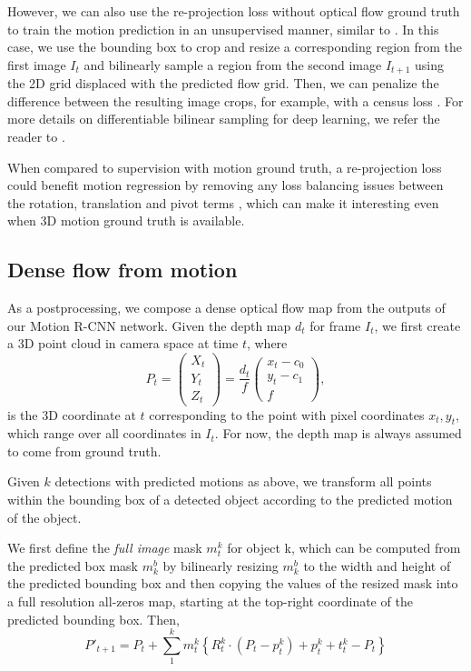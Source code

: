 However, we can also use the re-projection loss without optical flow ground truth
to train the motion prediction in an unsupervised manner, similar to \cite{SfmNet}.
In this case, we use the bounding box to crop and resize a corresponding region
from the first image $I_t$ and bilinearly sample a region from the second image $I_{t+1}$
using the 2D grid displaced with the predicted flow grid. Then, we can penalize the difference
between the resulting image crops, for example, with a census loss \cite{CensusTerm,UnFlow}.
For more details on differentiable bilinear sampling for deep learning, we refer the reader to
\cite{STN}.

When compared to supervision with motion ground truth, a re-projection
loss could benefit motion regression by removing any loss balancing issues between the
rotation, translation and pivot terms \cite{PoseNet2},
which can make it interesting even when 3D motion ground truth is available.


\subsection{Dense flow from motion}
\label{ssec:postprocessing}
As a postprocessing, we compose a dense optical flow map from the outputs of our Motion R-CNN network.
Given the depth map $d_t$ for frame $I_t$, we first create a 3D point cloud in camera space at time $t$,
where
\begin{equation}
P_t =
\begin{pmatrix}
X_t \\ Y_t \\ Z_t
\end{pmatrix}
=
\frac{d_t}{f}
\begin{pmatrix}
x_t - c_0 \\ y_t - c_1 \\ f
\end{pmatrix},
\end{equation}
is the 3D coordinate at $t$ corresponding to the point with pixel coordinates $x_t, y_t$,
which range over all coordinates in $I_t$.
For now, the depth map is always assumed to come from ground truth.

Given $k$ detections with predicted motions as above, we transform all points within the bounding
box of a detected object according to the predicted motion of the object.

We first define the \emph{full image} mask $m_t^k$ for object k,
which can be computed from the predicted box mask $m_k^b$ by bilinearly resizing
$m_k^b$ to the width and height of the predicted bounding box and then copying the values
of the resized mask into a full resolution all-zeros map, starting at the top-right coordinate of the predicted bounding box.
Then,
\begin{equation}
P'_{t+1} =
P_t + \sum_1^{k} m_t^k\left\{ R_t^k \cdot (P_t - p_t^k) + p_t^k + t_t^k - P_t \right\}
\end{equation}

